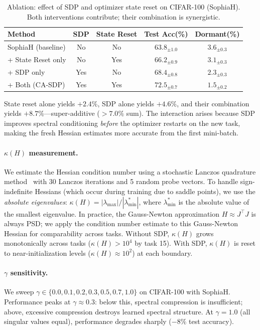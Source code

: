 \documentclass{article}
\begin{document}
\begin{table}[h]
\caption{Ablation: effect of SDP and optimizer state reset on CIFAR-100 (SophiaH). Both interventions contribute; their combination is synergistic.}
\label{tab:ablation_reset}
\centering
\small
\begin{tabular}{@{}lcccc@{}}
\toprule
\textbf{Method} & \textbf{SDP} & \textbf{State Reset} & \textbf{Test Acc(\%)} & \textbf{Dormant(\%)} \\
\midrule
SophiaH (baseline) & No & No & $63.8_{\pm1.0}$ & $3.6_{\pm0.3}$ \\
+ State Reset only  & No & Yes & $66.2_{\pm0.9}$ & $3.1_{\pm0.3}$ \\
+ SDP only          & Yes & No & $68.4_{\pm0.8}$ & $2.3_{\pm0.3}$ \\
+ Both (CA-SDP)     & Yes & Yes & $\mathbf{72.5}_{\pm0.7}$ & $\mathbf{1.5}_{\pm0.2}$ \\
\bottomrule
\end{tabular}
\end{table}

State reset alone yields $+2.4\%$, SDP alone yields $+4.6\%$, and their combination yields $+8.7\%$---super-additive ($> 7.0\%$ sum). The interaction arises because SDP improves spectral conditioning \emph{before} the optimizer restarts on the new task, making the fresh Hessian estimates more accurate from the first mini-batch.

\paragraph{$\kappa(H)$ measurement.}
We estimate the Hessian condition number using a stochastic Lanczos quadrature method~\citep{ghorbani2019investigation} with 30 Lanczos iterations and 5 random probe vectors. To handle sign-indefinite Hessians (which occur during training due to saddle points), we use the \emph{absolute eigenvalues}: $\kappa(H) = |\lambda_{\max}| / |\lambda_{\min}^*|$, where $\lambda_{\min}^*$ is the absolute value of the smallest eigenvalue. In practice, the Gauss-Newton approximation $H \approx J^\top J$ is always PSD; we apply the condition number estimate to this Gauss-Newton Hessian for comparability across tasks. Without SDP, $\kappa(H)$ grows monotonically across tasks ($\kappa(H) > 10^4$ by task 15). With SDP, $\kappa(H)$ is reset to near-initialization levels ($\kappa(H) \approx 10^2$) at each boundary.

\paragraph{$\gamma$ sensitivity.} We sweep $\gamma \in \{0.0, 0.1, 0.2, 0.3, 0.5, 0.7, 1.0\}$ on CIFAR-100 with SophiaH. Performance peaks at $\gamma \approx 0.3$: below this, spectral compression is insufficient; above, excessive compression destroys learned spectral structure. At $\gamma = 1.0$ (all singular values equal), performance degrades sharply ($-8\%$ test accuracy).
\end{document}
